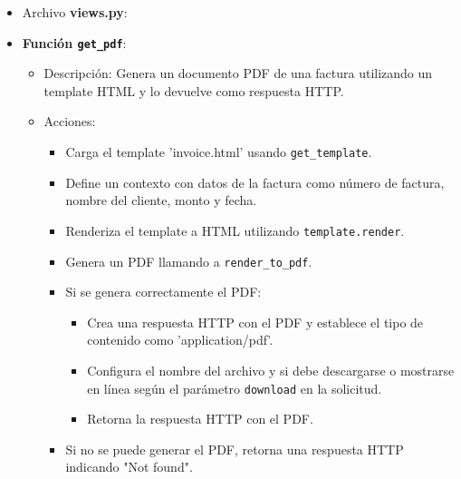 \documentclass{article}
\begin{document}
    

    \begin{itemize}
        \item Archivo \textbf{views.py}:
        \item \textbf{Función \texttt{get\_pdf}}:
            \begin{itemize}
                \item Descripción: Genera un documento PDF de una factura utilizando un template HTML y lo devuelve como respuesta HTTP.
                \item Acciones:
                    \begin{itemize}
                        \item Carga el template 'invoice.html' usando \texttt{get\_template}.
                        \item Define un contexto con datos de la factura como número de factura, nombre del cliente, monto y fecha.
                        \item Renderiza el template a HTML utilizando \texttt{template.render}.
                        \item Genera un PDF llamando a \texttt{render\_to\_pdf}.
                        \item Si se genera correctamente el PDF:
                            \begin{itemize}
                                \item Crea una respuesta HTTP con el PDF y establece el tipo de contenido como 'application/pdf'.
                                \item Configura el nombre del archivo y si debe descargarse o mostrarse en línea según el parámetro \texttt{download} en la solicitud.
                                \item Retorna la respuesta HTTP con el PDF.
                            \end{itemize}
                        \item Si no se puede generar el PDF, retorna una respuesta HTTP indicando "Not found".
                    \end{itemize}
            \end{itemize}
            

\end{itemize}
\end{document}
